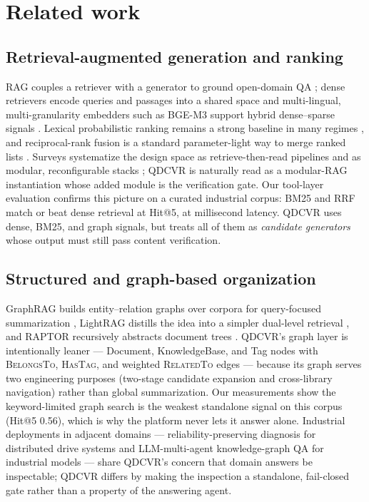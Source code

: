 \section{Related work}
\label{sec:related}

\subsection{Retrieval-augmented generation and ranking}
RAG couples a retriever with a generator to ground open-domain QA
\cite{rag-lewis}; dense retrievers encode queries and passages into a shared
space \cite{dpr} and multi-lingual, multi-granularity embedders such as
BGE-M3 support hybrid dense--sparse signals \cite{bge-m3}. Lexical
probabilistic ranking remains a strong baseline in many regimes \cite{bm25},
and reciprocal-rank fusion is a standard parameter-light way to merge ranked
lists \cite{rrf-cormack}. Surveys systematize the design space as
retrieve-then-read pipelines \cite{gao-ragsurvey} and as modular,
reconfigurable stacks \cite{modular-rag}; QDCVR is naturally read as a
modular-RAG instantiation whose added module is the verification gate.
Our tool-layer evaluation confirms this picture on
a curated industrial corpus: BM25 and RRF match or beat dense retrieval at
Hit@5, at millisecond latency. QDCVR uses dense, BM25, and graph signals, but
treats all of them as \emph{candidate generators} whose output must still
pass content verification.

\subsection{Structured and graph-based organization}
GraphRAG builds entity--relation graphs over corpora for query-focused
summarization \cite{graphrag}, LightRAG distills the idea into a simpler
dual-level retrieval \cite{lightrag}, and RAPTOR recursively abstracts
document trees \cite{raptor}. QDCVR's graph layer is intentionally leaner ---
Document, KnowledgeBase, and Tag nodes with \textsc{BelongsTo},
\textsc{HasTag}, and weighted \textsc{RelatedTo} edges --- because its graph
serves two engineering purposes (two-stage candidate expansion and
cross-library navigation) rather than global summarization. Our measurements
show the keyword-limited graph search is the weakest standalone signal on
this corpus (Hit@5 0.56), which is why the platform never lets it answer
alone. Industrial deployments in adjacent domains --- reliability-preserving
diagnosis for distributed drive systems \cite{rrpdg} and LLM-multi-agent
knowledge-graph QA for industrial models \cite{comaikg} --- share QDCVR's
concern that domain answers be inspectable; QDCVR differs by making the
inspection a standalone, fail-closed gate rather than a property of the
answering agent.

